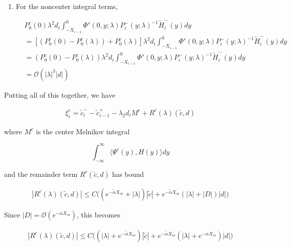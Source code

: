\documentclass[12pt]{article}
\begin{document}
\begin{enumerate}
\item For the noncenter integral terms,

\begin{align*}
&P_0^c(0) \lambda^2 d_i \int_{-X_{i-1}}^0 \Phi^s(0, y; \lambda) P_i^-(y; \lambda)^{-1} \tilde{H}_i^-(y) dy \\
&= [(P_0^c(0) - P_0^c(\lambda)) + P_0^c(\lambda)] \lambda^2 d_i \int_{-X_{i-1}}^0 \Phi^s(0, y; \lambda) P_i^-(y; \lambda)^{-1} \tilde{H}_i^-(y) dy \\
&= (P_0^c(0) - P_0^c(\lambda)) \lambda^2 d_i \int_{-X_{i-1}}^0 \Phi^s(0, y; \lambda) P_i^-(y; \lambda)^{-1} \tilde{H}_i^-(y) dy \\
&= \mathcal{O}(|\lambda|^3 |d| )
\end{align*}

\end{enumerate}

Putting all of this together, we have

\begin{align*}
\xi^c_i = \tilde{c}_i^- - \tilde{c}_{i-1}^+ - \lambda_2 d_i M^c + R^c(\lambda)(\tilde{c}, d)
\end{align*}

where $M^c$ is the center Melnikov integral

\[
\int_{-\infty}^\infty \langle \Psi^c(y), H(y) \rangle dy 
\]

and the remainder term $R^c(\tilde{c}, d)$ has bound

\begin{align*}
|R^c(\lambda)(\tilde{c}, d)| 
\leq C \Big( (e^{-\tilde{\alpha}X_m} + |\lambda|)|\tilde{c}| + e^{-\tilde{\alpha}X_m}(|\lambda| + |D|)|d| \Big)
\end{align*}

Since $|D| = \mathcal{O}(e^{-\alpha X_m})$, this becomes

\begin{align*}
|R^c(\lambda)(\tilde{c}, d)| 
\leq C \Big( (|\lambda| + e^{-\tilde{\alpha}X_m})|\tilde{c}| + e^{-\tilde{\alpha}X_m}(|\lambda| + e^{-\alpha X_m})|d| \Big)
\end{align*}
\end{document}
